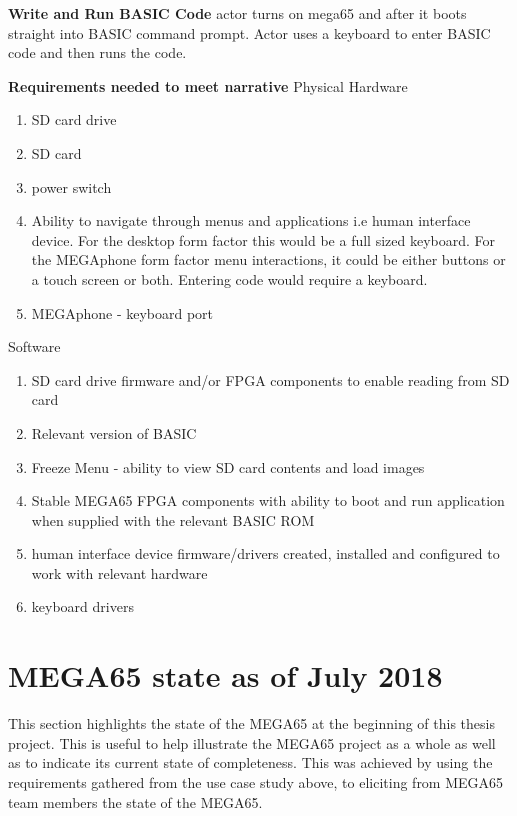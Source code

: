 \textbf{Write and Run BASIC Code}
actor turns on mega65 and after it boots straight into BASIC command prompt. Actor uses a keyboard to enter BASIC code and then runs the code.

\textbf{Requirements needed to meet narrative}
Physical Hardware
\begin{enumerate}
\item SD card drive
\item SD card
\item power switch
\item Ability to navigate through menus and applications i.e human interface device. For the desktop form factor this would be a full sized keyboard. For the MEGAphone form factor menu interactions, it could be either buttons or a touch screen or both. Entering code would require a keyboard.
\item MEGAphone - keyboard port
\end{enumerate}

Software
\begin{enumerate}
\item SD card drive firmware and/or FPGA components to enable reading from SD card
\item Relevant version of BASIC 
\item Freeze Menu - ability to view SD card contents and load images
\item Stable MEGA65 FPGA components with ability to boot and run application when supplied with the relevant BASIC ROM
\item human interface device firmware/drivers created, installed and configured to work with relevant hardware
\item keyboard drivers
\end{enumerate}

\section{MEGA65 state as of July 2018}
This section highlights the state of the MEGA65 at the beginning of this thesis project. This is useful to help illustrate the MEGA65 project as a whole as well as to indicate its current state of completeness. This was achieved by using the requirements gathered from the use case study above, to eliciting from MEGA65 team members the state of the MEGA65.

